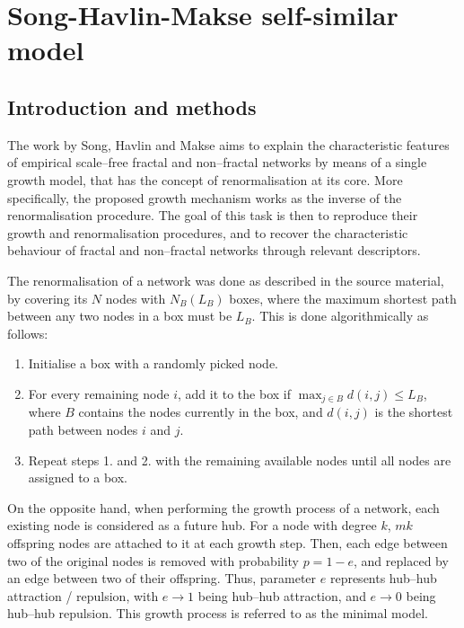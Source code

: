 \chapter{Song-Havlin-Makse self-similar model}


\section{Introduction and methods}
 
The work by Song, Havlin and Makse \cite{song2006origins} aims to explain the characteristic features of empirical scale--free fractal and non--fractal networks by means of a single growth model, that has the concept of renormalisation at its core. More specifically, the proposed growth mechanism works as the inverse of the renormalisation procedure. The goal of this task is then to reproduce their growth and renormalisation procedures, and to recover the characteristic behaviour of fractal and non--fractal networks through relevant descriptors.

The renormalisation of a network was done as described in the source material, by covering its $N$ nodes with $N_B(L_B)$ boxes, where the maximum shortest path between any two nodes in a box must be $L_B$. This is done algorithmically as follows:

\begin{enumerate}
	\item Initialise a box with a randomly picked node.
	\item For every remaining node $i$, add it to the box if $\max_{j\in B} d(i,j) \leq L_B$, where $B$ contains the nodes currently in the box, and $d(i,j)$ is the shortest path between nodes $i$ and $j$.
	\item Repeat steps 1. and 2. with the remaining available nodes until all nodes are assigned to a box.
\end{enumerate}

On the opposite hand, when performing the growth process of a network, each existing node is considered as a future hub. For a node with degree $k$, $mk$ offspring nodes are attached to it at each growth step. Then, each edge between two of the original nodes is removed with probability $p=1-e$, and replaced by an edge between two of their offspring. Thus, parameter $e$ represents hub--hub attraction / repulsion, with $e\rightarrow1$ being hub--hub attraction, and $e\rightarrow0$ being hub--hub repulsion. This growth process is referred to as the minimal model.

